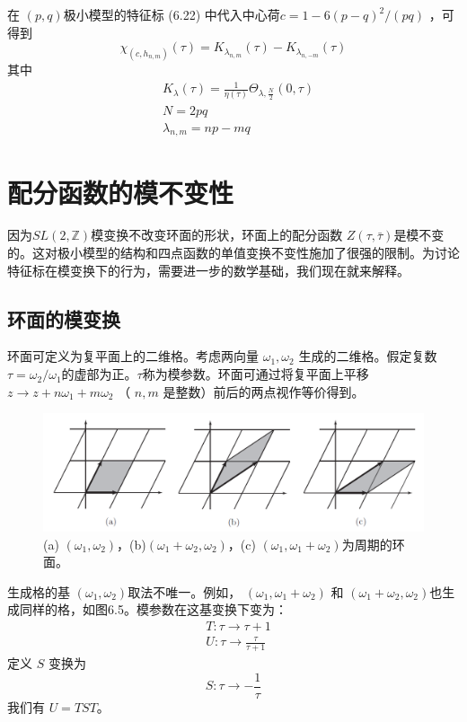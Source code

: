 在 $(p,q) $极小模型的特征标 (6.22) 中代入中心荷$ c=1- 6(p-q)^{2}/(p q)$ ，可得到
\begin{equation}
	\chi_{\left(c, h_{n, m}\right)}(\tau)=K_{\lambda_{n, m}}(\tau)-K_{\lambda_{n,-m}}(\tau) 
\end{equation}
其中
\begin{align} &K_{\lambda}(\tau)=\frac{1}{\eta(\tau)} \Theta_{\lambda, \frac{N}{2}}(0, \tau)\\ & N=2 p q \\ & \lambda_{n, m}=n p-m q  \end{align}

\section{配分函数的模不变性}
因为$ SL(2,\mathbb{Z}) $模变换不改变环面的形状，环面上的配分函数 $Z(\tau, \bar{\tau}) $是模不变的。这对极小模型的结构和四点函数的单值变换不变性施加了很强的限制。为讨论特征标在模变换下的行为，需要进一步的数学基础，我们现在就来解释。

\subsection{ 环面的模变换}

环面可定义为复平面上的二维格。考虑两向量 $\omega_1,\omega_2$ 生成的二维格。假定复数 $\tau=\omega_2/\omega_1 $的虚部为正。$ \tau $称为模参数。环面可通过将复平面上平移 $z \rightarrow z+n \omega_{1}+m \omega_{2}$ （ $n,m$ 是整数）前后的两点视作等价得到。

\begin{figure}[h]
	\centering
	\includegraphics[width=0.6\linewidth]{fig/6.5.png}
	\caption{(a) $(\omega_1,\omega_2)$，(b)$(\omega_1+\omega_2,\omega_2)$，(c) $(\omega_1,\omega_1+\omega_2)$为周期的环面。}
\end{figure}

生成格的基 $(\omega_1,\omega_2) $取法不唯一。例如， $\left(\omega_{1}, \omega_{1}+\omega_{2}\right)$ 和 $\left(\omega_{1}+\omega_{2}, \omega_{2}\right) $也生成同样的格，如图6.5。模参数在这基变换下变为：
\begin{align} &T: \tau \rightarrow \tau+1 \\ &U: \tau \rightarrow \frac{\tau}{\tau+1} \end{align}
定义 $S$ 变换为
\begin{equation}
	S: \tau \rightarrow-\frac{1}{\tau}
\end{equation} 
我们有 $U=T S T $。

